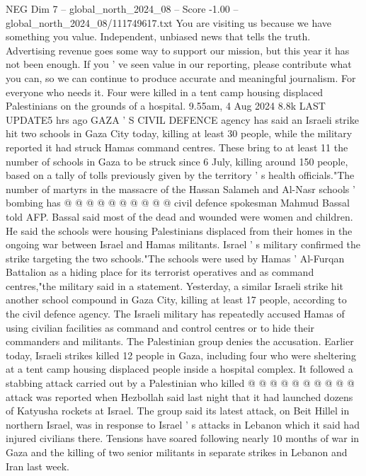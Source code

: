 \begin{textsample}{NEG Dim 7 – global\_north\_2024\_08 – Score -1.00 – global\_north\_2024\_08/111749617.txt}  \label{ex:f7_neg_437}
You are visiting us because we have something you value.
Independent, unbiased news that tells the truth.
Advertising revenue goes some way to support our mission, but this year it has not been enough.
If you ' ve seen value in our reporting, please contribute what you can, so we can continue to produce accurate and meaningful journalism.
For everyone who needs it.
Four were killed in a tent camp housing displaced Palestinians on the grounds of a hospital. 9.55am, 4 Aug 2024 8.8k LAST UPDATE5 hrs ago GAZA ' S CIVIL DEFENCE agency has said an Israeli strike hit two schools in Gaza City today, killing at least 30 people, while the military reported it had struck Hamas command centres.
These bring to at least 11 the number of schools in Gaza to be struck since 6 July, killing around 150 people, based on a tally of tolls previously given by the territory ' s health officials."The number of martyrs in the massacre of the Hassan Salameh and Al-Nasr schools ' bombing has @ @ @ @ @ @ @ @ @ @ civil defence spokesman Mahmud Bassal told AFP.
Bassal said most of the dead and wounded were women and children.
He said the schools were housing Palestinians displaced from their homes in the ongoing war between Israel and Hamas militants.
Israel ' s military confirmed the strike targeting the two schools."The schools were used by Hamas ' Al-Furqan Battalion as a hiding place for its terrorist operatives and as command centres,"the military said in a statement.
Yesterday, a similar Israeli strike hit another school compound in Gaza City, killing at least 17 people, according to the civil defence agency.
The Israeli military has repeatedly accused Hamas of using civilian facilities as command and control centres or to hide their commanders and militants.
The Palestinian group denies the accusation.
Earlier today, Israeli strikes killed 12 people in Gaza, including four who were sheltering at a tent camp housing displaced people inside a hospital complex.
It followed a stabbing attack carried out by a Palestinian who killed @ @ @ @ @ @ @ @ @ @ attack was reported when Hezbollah said last night that it had launched dozens of Katyusha rockets at Israel.
The group said its latest attack, on Beit Hillel in northern Israel, was in response to Israel ' s attacks in Lebanon which it said had injured civilians there.
Tensions have soared following nearly 10 months of war in Gaza and the killing of two senior militants in separate strikes in Lebanon and Iran last week.

\end{textsample}
